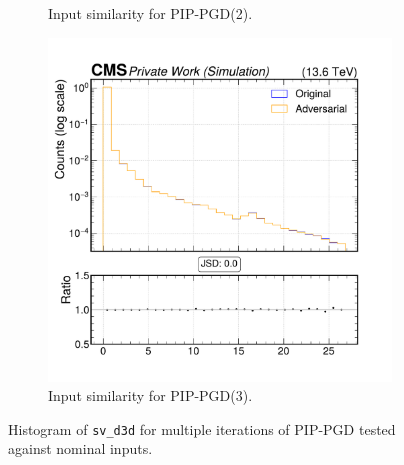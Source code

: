 \begin{figure}[htbp]
\begin{subfigure}[t]{0.32\textwidth}
    \caption*{Input similarity for PIP-PGD(2).}
  \end{subfigure}\hfill
  \begin{subfigure}[t]{0.32\textwidth}
    \includegraphics[width=\linewidth]{media/output/features/compare/combined_it_3/cmp_vtx_arr_sv_d3d.pdf}
    \caption*{Input similarity for PIP-PGD(3).}
  \end{subfigure}

  \caption*{Histogram of \texttt{sv\_d3d} for multiple iterations of PIP-PGD tested against nominal inputs.}
  \label{fig:combined_input_sv_d3d}
\end{figure}

